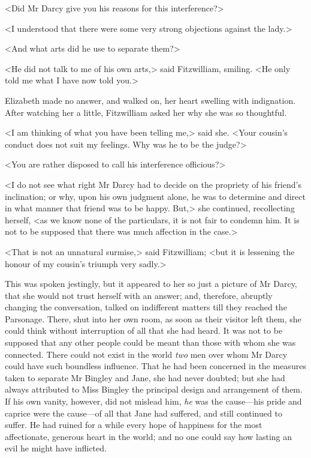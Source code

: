 <Did Mr Darcy give you his reasons for this interference?>

<I understood that there were some very strong objections against the lady.>

<And what arts did he use to separate them?>

<He did not talk to me of his own arts,> said Fitzwilliam, smiling. <He only told me what I have now told you.>

Elizabeth made no answer, and walked on, her heart swelling with indignation. After watching her a little, Fitzwilliam asked her why she was so thoughtful.

<I am thinking of what you have been telling me,> said she. <Your cousin's conduct does not suit my feelings. Why was he to be the judge?>

<You are rather disposed to call his interference officious?>

<I do not see what right Mr Darcy had to decide on the propriety of his friend's inclination; or why, upon his own judgment alone, he was to determine and direct in what manner that friend was to be happy. But,> she continued, recollecting herself, <as we know none of the particulars, it is not fair to condemn him. It is not to be supposed that there was much affection in the case.>

<That is not an unnatural surmise,> said Fitzwilliam; <but it is lessening the honour of my cousin's triumph very sadly.>

This was spoken jestingly, but it appeared to her so just a picture of Mr Darcy, that she would not trust herself with an answer; and, therefore, abruptly changing the conversation, talked on indifferent matters till they reached the Parsonage. There, shut into her own room, as soon as their visitor left them, she could think without interruption of all that she had heard. It was not to be supposed that any other people could be meant than those with whom she was connected. There could not exist in the world \textit{two} men over whom Mr Darcy could have such boundless influence. That he had been concerned in the measures taken to separate Mr Bingley and Jane, she had never doubted; but she had always attributed to Miss Bingley the principal design and arrangement of them. If his own vanity, however, did not mislead him, \textit{he} was the cause—his pride and caprice were the cause—of all that Jane had suffered, and still continued to suffer. He had ruined for a while every hope of happiness for the most affectionate, generous heart in the world; and no one could say how lasting an evil he might have inflicted.

